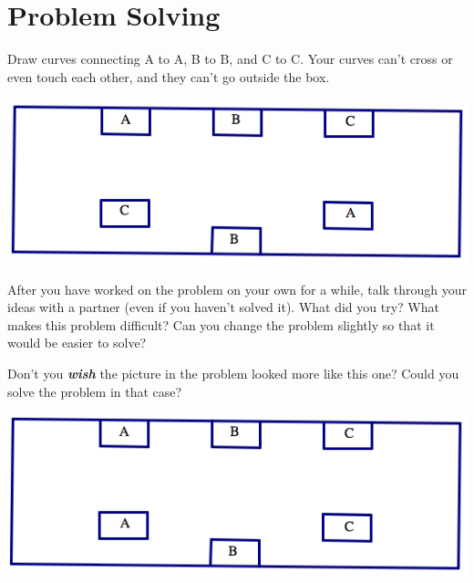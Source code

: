 
\chapter{Problem Solving}


\begin{problem}[ABC]
Draw curves connecting A to A, B to B, and C to C.  Your curves can't cross or even touch each other, and they can't go outside the box.
\begin{center}
\includegraphics[height=4 cm]{../Pictures/ProbSolvingPics/prob1_pic1}
\end{center}
\end{problem}


\begin{thinkpair*}
After you have worked on the problem on your own for a while, talk through your ideas with a partner (even if you haven't solved it).  What did you try?   What makes this problem difficult?  Can you change the problem slightly so that it would be easier to solve?
\end{thinkpair*}

\begin{ps}
Don't you \emph{\bf wish} the picture in the problem looked more like this one?  Could you solve the problem in that case?
\begin{center}
\includegraphics[height=4 cm]{../Pictures/ProbSolvingPics/prob1_pic2}
\end{center}
\end{ps}

